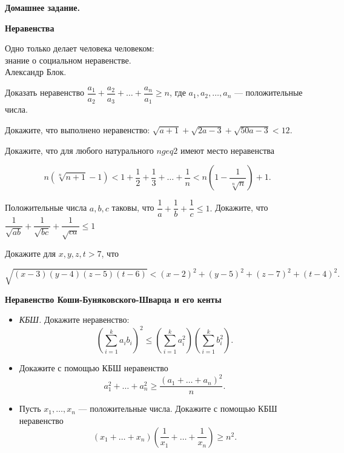 \centerline{\bf \Huge Домашнее задание.}
\centerline{\bf \Huge Неравенства}

\begin{flushright}
        \scriptsize{Одно только делает человека человеком:\\ знание о социальном неравенстве.\\Александр Блок.}
\end{flushright}

Доказать неравенство $\dfrac{a_1}{a_2} + \dfrac{a_2}{a_3} + \ldots + \dfrac{a_n}{a_1} \geq n$, где $a_1, a_2, \ldots, a_n$ --- положительные числа.

Докажите, что выполнено неравенство: $ \sqrt{a+1} + \sqrt{2a - 3} + \sqrt{50a - 3} < 12.$

Докажите, что для любого натурального $n geq 2$ имеют место неравенства

\[
n \left(\sqrt[n]{n+1} - 1 \right) < 1 + \dfrac{1}{2} + \dfrac{1}{3} + \ldots + \dfrac{1}{n} < n \left(1 - \dfrac{1}{\sqrt[n]{n}} \right) + 1.
\]


Положительные числа $a, b, c$ таковы, что $\dfrac{1}{a} + \dfrac{1}{b} + \dfrac{1}{c} \leq 1.$ Докажите, что $\dfrac{1}{\sqrt{ab}} + \dfrac{1}{\sqrt{bc}} + \dfrac{1}{\sqrt{ca}} \leq 1$

Докажите для $x, y, z, t > 7$, что

\[\sqrt{(x-3)(y-4)(z-5)(t-6)} < (x-2)^2 + (y-5)^2 + (z-7)^2 + (t-4)^2.\]

\textbf{Неравенство Коши-Буняковского-Шварца и его кенты} 
\begin{itemize}
    \item[a)] \textit{КБШ.} Докажите неравенство:
    \[\left( \sum_{i=1}^{k} a_i b_i \right)^2 \leq \left( \sum_{i=1}^{k} a_i^2 \right) \left( \sum_{i=1}^{k} b_i^2 \right).\]
    \item[b)] Докажите с помощью КБШ неравенство 
    \[a_1^2 + \ldots + a_n^2 \geq \dfrac{(a_1 + \ldots + a_n)^2}{n}.\]
    \item[c)] Пусть $x_1, \ldots, x_n$ — положительные числа. Докажите с помощью КБШ неравенство
    \[(x_1 + \ldots + x_n)\left(\dfrac{1}{x_1} + \ldots + \dfrac{1}{x_n}\right) \geq n^2.\]
\end{itemize}